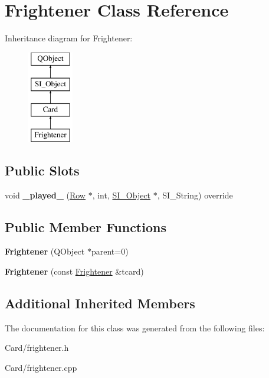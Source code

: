 \hypertarget{class_frightener}{}\section{Frightener Class Reference}
\label{class_frightener}
Inheritance diagram for Frightener\+:\begin{figure}[H]
\begin{center}
\leavevmode
\includegraphics[height=4.000000cm]{class_frightener}
\end{center}
\end{figure}
\subsection*{Public Slots}
\begin{DoxyCompactItemize}
\item 
\mbox{\label{class_frightener_a0f757dbe33e2aecd8100fea2a1ff080f}} 
void {\bfseries \+\_\+played\+\_\+} (\hyperlink{class_card_set}{Row} $\ast$, int, \hyperlink{class_s_i___object}{S\+I\+\_\+\+Object} $\ast$, S\+I\+\_\+\+String) override
\end{DoxyCompactItemize}
\subsection*{Public Member Functions}
\begin{DoxyCompactItemize}
\item 
\mbox{\label{class_frightener_a2b4d70bb88e810dd7eca435b5067746d}} 
{\bfseries Frightener} (Q\+Object $\ast$parent=0)
\item 
\mbox{\label{class_frightener_aaae90e2a53896add41e6722b4d221c04}} 
{\bfseries Frightener} (const \hyperlink{class_frightener}{Frightener} \&tcard)
\end{DoxyCompactItemize}
\subsection*{Additional Inherited Members}


The documentation for this class was generated from the following files\+:\begin{DoxyCompactItemize}
\item 
Card/frightener.\+h\item 
Card/frightener.\+cpp\end{DoxyCompactItemize}
